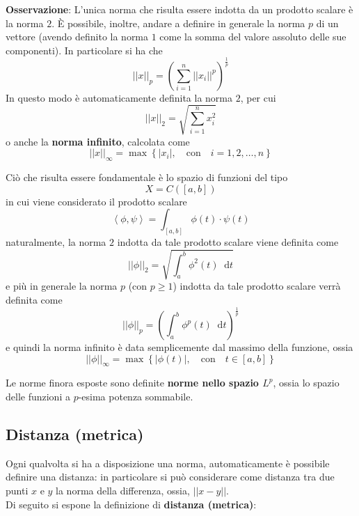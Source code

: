 \documentclass[a4paper]{extarticle}
\newcommand*\dif{\mathop{}\!\mathrm{d}}
\begin{document}
\vspace{1em}
\noindent
\textbf{Osservazione}: L'unica norma che risulta essere indotta da un prodotto scalare è la norma $2$. È possibile, inoltre, andare a definire in generale la norma $p$ di un vettore (avendo definito la norma $1$ come la somma del valore assoluto delle sue componenti). In particolare si ha che
\[\vert \vert x \vert \vert_p = \left(\sum_{i=1}^n \vert \vert x_i \vert \vert ^p\right)^{\frac{1}{p}}\]
In questo modo è automaticamente definita la norma $2$, per cui
\[\vert \vert x \vert \vert_2 = \sqrt{\sum_{i=1}^n x_i^2}\]
o anche la \textbf{norma infinito}, calcolata come
\[\vert \vert x \vert \vert_\infty = \max \left\{\vert x_i \vert, \hspace{1em} \text{con} \hspace{1em} i=1,2,\dots,n\right\}\]

\vspace{1em}
\noindent
Ciò che risulta essere fondamentale è lo spazio di funzioni del tipo
\[X = C \left([a,b]\right)\]
in cui viene considerato il prodotto scalare
\[\left<\phi,\psi\right> = \int_{[a,b]} \phi(t) \cdot \psi(t)\]
naturalmente, la norma $2$ indotta da tale prodotto scalare viene definita come
\[\vert \vert \phi \vert \vert_2 = \sqrt{\int_a^b \phi^2(t) \dif t}\]
e più in generale la norma $p$ (con $p \geq 1$) indotta da tale prodotto scalare verrà definita come
\[\vert \vert \phi \vert \vert_p = \left(\int_a^b \phi^p(t) \dif t \right)^{\frac{1}{p}}\]
e quindi la norma infinito è data semplicemente dal massimo della funzione, ossia
\[\vert \vert \phi \vert \vert_\infty = \max \left\{ \vert \phi(t) \vert, \hspace{1em} \text{con} \hspace{1em} t \in [a,b] \right\}\]

\vspace{1em}
\noindent
Le norme finora esposte sono definite \textbf{norme nello spazio $L^p$}, ossia lo spazio delle funzioni a $p$-esima potenza sommabile.

\vspace{1em}
\noindent
\subsection{Distanza (metrica)}
Ogni qualvolta si ha a disposizione una norma, automaticamente è possibile definire una distanza: in particolare si può considerare come distanza tra due punti $x$ e $y$ la norma della differenza, ossia, $\vert \vert x-y \vert \vert$.\\
Di seguito si espone la definizione di \textbf{distanza (metrica)}:
\end{document}
